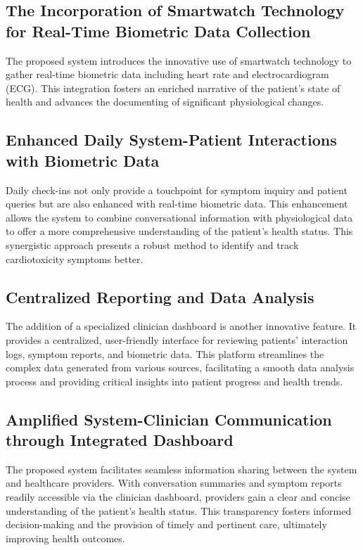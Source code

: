 \documentclass[11pt]{article}
\begin{document}
\subsection{The Incorporation of Smartwatch Technology for Real-Time Biometric Data Collection}

The proposed system introduces the innovative use of smartwatch technology to gather real-time biometric data including heart rate and electrocardiogram (ECG). This integration fosters an enriched narrative of the patient's state of health and advances the documenting of significant physiological changes.

\subsection{Enhanced Daily System-Patient Interactions with Biometric Data}

Daily check-ins not only provide a touchpoint for symptom inquiry and patient queries but are also enhanced with real-time biometric data. This enhancement allows the system to combine conversational information with physiological data to offer a more comprehensive understanding of the patient's health status. This synergistic approach presents a robust method to identify and track cardiotoxicity symptoms better.

\subsection{Centralized Reporting and Data Analysis}

The addition of a specialized clinician dashboard is another innovative feature. It provides a centralized, user-friendly interface for reviewing patients' interaction logs, symptom reports, and biometric data. This platform streamlines the complex data generated from various sources, facilitating a smooth data analysis process and providing critical insights into patient progress and health trends.

\subsection{Amplified System-Clinician Communication through Integrated Dashboard}

The proposed system facilitates seamless information sharing between the system and healthcare providers. With conversation summaries and symptom reports readily accessible via the clinician dashboard, providers gain a clear and concise understanding of the patient's health status. This transparency fosters informed decision-making and the provision of timely and pertinent care, ultimately improving health outcomes.
\end{document}
